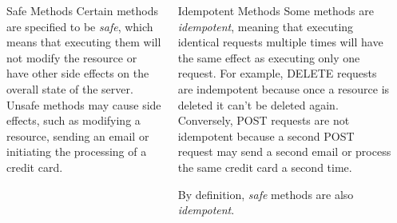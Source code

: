 \documentclass[final,table]{beamer}
\begin{document}
\begin{frame}{}
\begin{columns}
\begin{column}{0.9\textwidth}
        \begin{columns}
          \begin{column}{0.34\textwidth}
            \begin{block}{\huge{Safe Methods}}
              \Large
              Certain methods are specified to be \emph{safe}, which means that executing
              them will not modify the resource or have other side effects on the
              overall state of the server. Unsafe methods may cause side effects, such
              as modifying a resource, sending an email or initiating the processing of
              a credit card.
            \end{block}
          \end{column}
          \begin{column}{0.64\textwidth}
            \begin{block}{\huge{Idempotent Methods}}
              \Large
              Some methods are \emph{idempotent}, meaning that executing identical
              requests multiple times will have the same effect as executing only one
              request. For example, DELETE requests are indempotent because once a
              resource is deleted it can't be deleted again. Conversely, POST requests
              are not idempotent because a second POST request may send a second email
              or process the same credit card a second time.

              By definition, \emph{safe} methods are also \emph{idempotent}.
            \end{block}
          \end{column}
        \end{columns}

      \end{column}
      \begin{column}{0.05\textwidth}
      \end{column}
    \end{columns}

  \end{frame}
\end{document}
